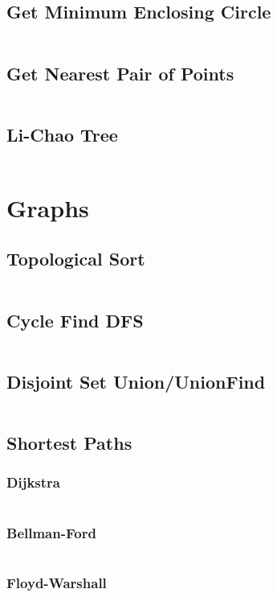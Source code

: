 \documentclass[a4paper, 8pt, landscape, oneside]{extarticle}
\begin{document}
\begin{multicols*}{3}
		\subsection{Get Minimum Enclosing Circle}
		\inputminted{cpp}{src/geometry/welzlmec.cpp}
		\subsection{Get Nearest Pair of Points}
		\inputminted{cpp}{src/geometry/getnearestpair.cpp}
		\subsection{Li-Chao Tree}
		\inputminted{cpp}{src/geometry/lichaotree.cpp}
    \section{Graphs}
    	\subsection{Topological Sort}
    	\inputminted{cpp}{src/graph/old_topo.cpp}
    	\subsection{Cycle Find DFS}
    	\inputminted{cpp}{src/graph/old_cycle-find-dfs.cpp}
    	\subsection{Disjoint Set Union/UnionFind}
    	\inputminted{cpp}{src/graph/dsu.cpp}
    	\subsection{Shortest Paths}
    		\subsubsection{Dijkstra}
    		\inputminted{cpp}{src/graph/old_dijkstra.cpp}
    		\subsubsection{Bellman-Ford}
    		\inputminted{cpp}{src/graph/old_bellman-ford.cpp}
    		\subsubsection{Floyd-Warshall}
    		\inputminted{cpp}{src/graph/old_floyd-warshall.cpp}

\end{multicols*}
\end{document}
